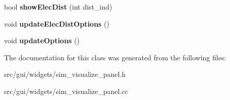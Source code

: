 \begin{DoxyCompactItemize}
\item 
bool {\bfseries show\+Elec\+Dist} (int dist\+\_\+ind)\hypertarget{classgui_1_1SimVisualize_a9cd0265a32e8d76f2e6b3af078bfa634}{}\label{classgui_1_1SimVisualize_a9cd0265a32e8d76f2e6b3af078bfa634}

\item 
void {\bfseries update\+Elec\+Dist\+Options} ()\hypertarget{classgui_1_1SimVisualize_af1d445b9329885d5cdfa3e66f6ae461b}{}\label{classgui_1_1SimVisualize_af1d445b9329885d5cdfa3e66f6ae461b}

\item 
void {\bfseries update\+Options} ()\hypertarget{classgui_1_1SimVisualize_a76589c9cd49ec321bdb545fefc97c63e}{}\label{classgui_1_1SimVisualize_a76589c9cd49ec321bdb545fefc97c63e}

\end{DoxyCompactItemize}


The documentation for this class was generated from the following files\+:\begin{DoxyCompactItemize}
\item 
src/gui/widgets/sim\+\_\+visualize\+\_\+panel.\+h\item 
src/gui/widgets/sim\+\_\+visualize\+\_\+panel.\+cc\end{DoxyCompactItemize}
